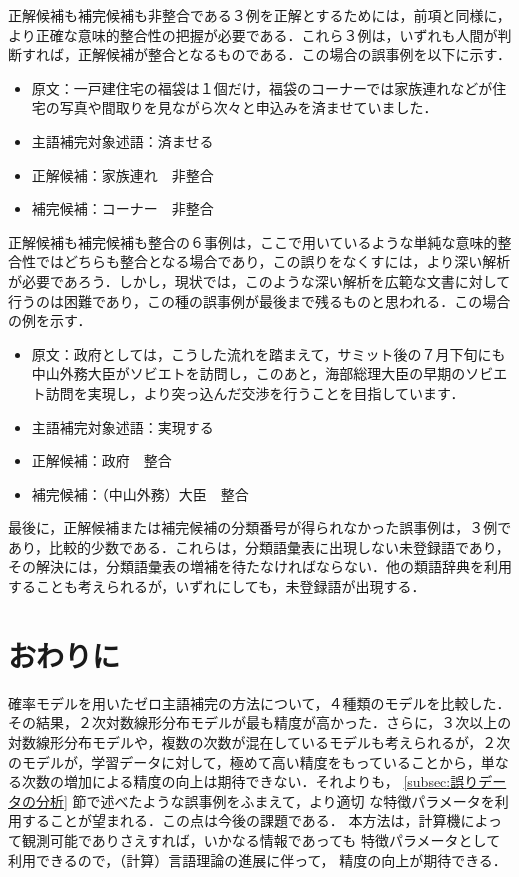正解候補も補完候補も非整合である３例を正解とするためには，前項と同様に，より正確な意味的整合性の把握が必要である．これら３例は，いずれも人間が判断すれば，正解候補が整合となるものである．この場合の誤事例を以下に示す．
\begin{itemize}
\item 原文：一戸建住宅の福袋は１個だけ，福袋のコーナーでは家族連れなどが住宅の写真や間取りを見ながら次々と申込みを済ませていました．
\item 主語補完対象述語：済ませる
\item 正解候補：家族連れ　非整合
\item 補完候補：コーナー　非整合
\vspace*{3mm}
\end{itemize}

正解候補も補完候補も整合の６事例は，ここで用いているような単純な意味的整合性ではどちらも整合となる場合であり，この誤りをなくすには，より深い解析が必要であろう．しかし，現状では，このような深い解析を広範な文書に対して行うのは困難であり，この種の誤事例が最後まで残るものと思われる．この場合の例を示す．
\begin{itemize}
\item 原文：政府としては，こうした流れを踏まえて，サミット後の７月下旬にも中山外務大臣がソビエトを訪問し，このあと，海部総理大臣の早期のソビエト訪問を実現し，より突っ込んだ交渉を行うことを目指しています．
\item 主語補完対象述語：実現する
\item 正解候補：政府　整合
\item 補完候補：（中山外務）大臣　整合
\vspace*{3mm}
\end{itemize}

最後に，正解候補または補完候補の分類番号が得られなかった誤事例は，３例であり，比較的少数である．これらは，分類語彙表に出現しない未登録語であり，その解決には，分類語彙表の増補を待たなければならない．他の類語辞典を利用することも考えられるが，いずれにしても，未登録語が出現する．

\section{おわりに}
確率モデルを用いたゼロ主語補完の方法について，４種類のモデルを比較した．
その結果，２次対数線形分布モデルが最も精度が高かった．さらに，３次以上の
対数線形分布モデルや，複数の次数が混在しているモデルも考えられるが，２次
のモデルが，学習データに対して，極めて高い精度をもっていることから，単な
る次数の増加による精度の向上は期待できない．それよりも，
\ref{subsec:誤りデータの分析} 節で述べたような誤事例をふまえて，より適切
な特徴パラメータを利用することが望まれる．この点は今後の課題である．
本方法は，計算機によって観測可能でありさえすれば，いかなる情報であっても
特徴パラメータとして利用できるので，（計算）言語理論の進展に伴って，
精度の向上が期待できる．

